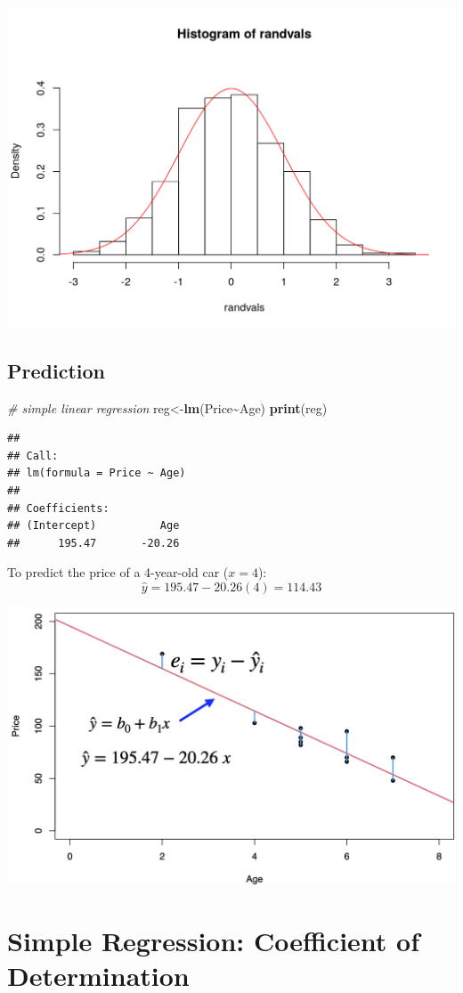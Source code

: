 \documentclass[
]{article}
\newenvironment{Shaded}{\begin{snugshade}}{\end{snugshade}}
\newcommand{\CommentTok}[1]{\textcolor[rgb]{0.56,0.35,0.01}{\textit{#1}}}
\newcommand{\FunctionTok}[1]{\textcolor[rgb]{0.13,0.29,0.53}{\textbf{#1}}}
\newcommand{\NormalTok}[1]{#1}
\newcommand{\OtherTok}[1]{\textcolor[rgb]{0.56,0.35,0.01}{#1}}
\newcommand{\SpecialCharTok}[1]{\textcolor[rgb]{0.81,0.36,0.00}{\textbf{#1}}}
\begin{document}
\begin{center}\includegraphics[width=0.5\linewidth,height=0.5\textheight]{unnamed-chunk-10-1} \end{center}

\hypertarget{prediction}{%
\subsection{Prediction}\label{prediction}}

\begin{Shaded}
\begin{Highlighting}[]
\CommentTok{\# simple linear regression}
\NormalTok{reg}\OtherTok{\textless{}{-}}\FunctionTok{lm}\NormalTok{(Price}\SpecialCharTok{\textasciitilde{}}\NormalTok{Age)}
\FunctionTok{print}\NormalTok{(reg)}
\end{Highlighting}
\end{Shaded}

\begin{verbatim}
## 
## Call:
## lm(formula = Price ~ Age)
## 
## Coefficients:
## (Intercept)          Age  
##      195.47       -20.26
\end{verbatim}

To predict the price of a 4-year-old car (\(x=4\)):
\[\hat{y}=195.47-20.26(4)=114.43\]

\begin{center}\includegraphics[width=0.6\linewidth,height=0.6\textheight]{figures/leastsq3} \end{center}

\hypertarget{simple-regression-coefficient-of-determination}{%
\section{Simple Regression: Coefficient of
Determination}\label{simple-regression-coefficient-of-determination}}
\end{document}
